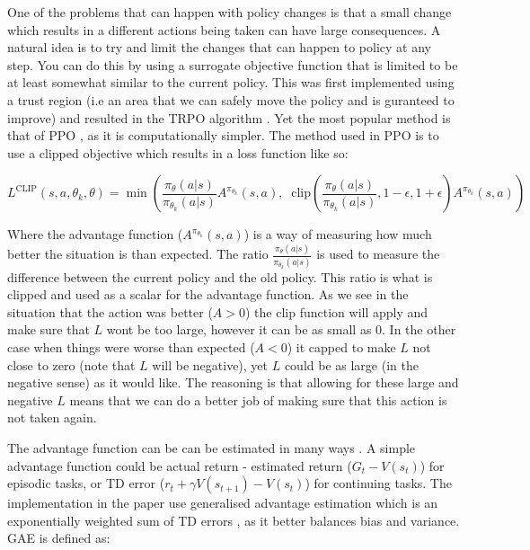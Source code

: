 One of the problems that can happen with policy changes is that a small change which results in a different actions being taken can have large consequences. A natural idea is to try and limit the changes that can happen to policy at any step. You can do this by using a surrogate objective function that is limited to be at least somewhat similar to the current policy. This was first implemented using a trust region (i.e an area that we can safely move the policy and is guranteed to improve) and resulted in the TRPO algorithm \cite{schulmanTrustRegionPolicy2017}. Yet the most popular method is that of PPO \cite{schulmanProximalPolicyOptimization2017}, as it is computationally simpler. The method used in PPO is to use a clipped objective which results in a loss function like so:

\begin{equation}
L^{\text{CLIP}}(s,a,\theta_k,\theta) = \min\left(
\frac{\pi_{\theta}(a|s)}{\pi_{\theta_k}(a|s)}  A^{\pi_{\theta_k}}(s,a), \;\;
\text{clip}\left(\frac{\pi_{\theta}(a|s)}{\pi_{\theta_k}(a|s)}, 1 - \epsilon, 1+\epsilon \right) A^{\pi_{\theta_k}}(s,a)
\right)
\end{equation}

Where the advantage function ($A^{\pi_{\theta_{k}}}(s,a)$) is a way of measuring how much better the situation is than expected. The ratio $\frac{\pi_{\theta}(a|s)}{\pi_{\theta_{k}}(a|s)}$ is used to measure the difference between the current policy and the old policy. This ratio is what is clipped and used as a scalar for the advantage function. As we see in the situation that the action was better ($A>0$) the clip function will apply and make sure that $L$ wont be too large, however it can be as small as 0. In the other case when things were worse than expected ($A < 0$) it capped to make $L$ not close to zero (note that $L$ will be negative), yet $L$ could be as large (in the negative sense) as it would like. The reasoning is that allowing for these large and negative $L$ means that we can do a better job of making sure that this action is not taken again.

The advantage function can be can be estimated in many ways . A simple advantage function could be actual return - estimated return ($G_{t} - V(s_{t})$) for episodic tasks, or TD error ($r_{t}+\gamma V(s_{t+1})-V(s_{t})$) for continuing tasks. The implementation in the paper use generalised advantage estimation which is an exponentially weighted sum of TD errors \cite{schulmanHighDimensionalContinuousControl2015}, as it better balances bias and variance. GAE is defined as:


